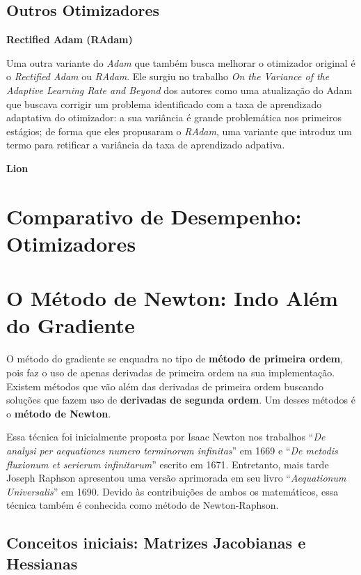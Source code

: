 \subsection{Outros Otimizadores}

\textbf{Rectified Adam (RAdam)}

Uma outra variante do \textit{Adam} que também busca melhorar o otimizador original é o \textit{Rectified Adam} ou \textit{RAdam}. Ele surgiu no trabalho \textit{On the Variance of the Adaptive Learning Rate and Beyond} dos autores \textcite{RAdamMethod} como uma atualização do Adam que buscava corrigir um problema identificado com a taxa de aprendizado adaptativa do otimizador: a sua variância é grande problemática nos primeiros estágios; de forma que eles propusaram o \textit{RAdam}, uma variante que introduz um termo para retificar a variância da taxa de aprendizado adpativa.

\textbf{Lion}

\section{Comparativo de Desempenho: Otimizadores}


\section{O Método de Newton: Indo Além do Gradiente}

O método do gradiente se enquadra no tipo de \textbf{método de primeira ordem}, pois faz o uso de apenas derivadas de primeira ordem na sua implementação. Existem métodos que vão além das derivadas de primeira ordem buscando soluções que fazem uso de \textbf{derivadas de segunda ordem}. Um desses métodos é o \textbf{método de Newton}.

Essa técnica foi inicialmente proposta por Isaac Newton nos trabalhos “\textit{De analysi per aequationes numero terminorum infinitas}” em 1669 e “\textit{De metodis fluxionum et serierum infinitarum}” escrito em 1671. Entretanto, mais tarde Joseph Raphson apresentou uma versão aprimorada em seu livro “\textit{Aequationum Universalis}” em 1690. Devido às contribuições de ambos os matemáticos, essa técnica também é conhecida como método de Newton-Raphson.

\subsection{Conceitos iniciais: Matrizes Jacobianas e Hessianas}

